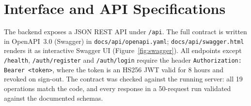 \section{Interface and API Specifications}
The backend exposes a JSON REST API under \texttt{/api}. The full contract is written
in OpenAPI~3.0 (Swagger) in \texttt{docs/api/openapi.yaml}; \texttt{docs/api/swagger.html}
renders it as interactive Swagger UI (Figure~\ref{fig:swagger}). All endpoints except
\texttt{/health}, \texttt{/auth/register} and \texttt{/auth/login} require the header
\texttt{Authorization: Bearer <token>}, where the token is an HS256 JWT valid for 8 hours
and revoked on sign-out. The contract was checked against the running server: all 19
operations match the code, and every response in a 50-request run validated against
the documented schemas.

